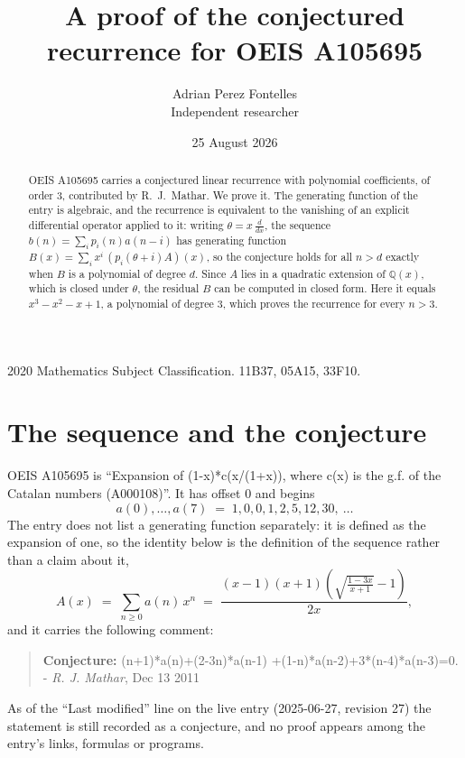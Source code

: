 \documentclass[11pt,a4paper]{article}
\title{A proof of the conjectured recurrence for OEIS A105695}
\author{Adrian Perez Fontelles\\ \small Independent researcher}
\date{25 August 2026}
\theoremstyle{plain}
\theoremstyle{definition}
\begin{document}
\maketitle

\begin{abstract}
OEIS A105695 carries a conjectured linear recurrence with polynomial coefficients, of
order 3, contributed by R.~J.~Mathar. We prove it. The generating function of the
entry is algebraic, and the recurrence is equivalent to the vanishing of an explicit
differential operator applied to it: writing $\theta=x\,\frac{d}{dx}$, the sequence
$b(n)=\sum_{i}p_{i}(n)a(n-i)$ has generating function
$B(x)=\sum_{i}x^{i}\,(p_{i}(\theta+i)A)(x)$, so the conjecture holds for all $n>d$ exactly
when $B$ is a polynomial of degree $d$. Since $A$ lies in a quadratic extension of
$\mathbb{Q}(x)$, which is closed under $\theta$, the residual $B$ can be computed in
closed form. Here it equals $x^{3} - x^{2} - x + 1$, a polynomial of degree $3$, which proves
the recurrence for every $n>3$.
\end{abstract}

\noindent\small 2020 Mathematics Subject Classification. 11B37, 05A15, 33F10.\normalsize

\section{The sequence and the conjecture}

OEIS A105695 is ``Expansion of (1-x)*c(x/(1+x)), where c(x) is the g.f. of the Catalan numbers (A000108)''. It has offset $0$ and begins
\[
a(0),\dots,a(7)\;=\;1, 0, 0, 1, 2, 5, 12, 30,\ \dots
\]
The entry does not list a generating function separately: it is defined as the
expansion of one, so the identity below is the definition of the sequence rather than a
claim about it,
\begin{equation}\label{eq:gf}
A(x)\;=\;\sum_{n\ge 0} a(n)\,x^{n}\;=\;\frac{\left(x - 1\right) \left(x + 1\right) \left(\sqrt{\frac{1 - 3 x}{x + 1}} - 1\right)}{2 x} ,
\end{equation}
and it carries the following comment:
\begin{quote}\small
\textbf{Conjecture:} (n+1)*a(n)+(2-3n)*a(n-1) +(1-n)*a(n-2)+3*(n-4)*a(n-3)=0. - \emph{R. J. Mathar}, Dec 13 2011
\end{quote}
As of the ``Last modified'' line on the live entry (2025-06-27, revision 27) the
statement is still recorded as a conjecture, and no proof appears among the entry's links,
formulas or programs.
\end{document}
